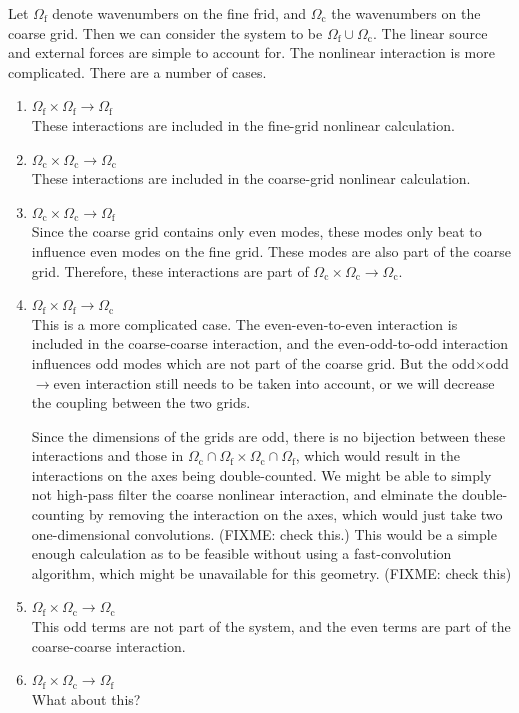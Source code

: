 \documentclass[10pt,showpacs,showkeys,%
amsfonts,amsmath,onecolumn,
floatfix,aps,superscriptaddress]{revtex4}
\begin{document}
Let $\Omega_{\text{f}}$ denote wavenumbers on the fine frid, and
$\Omega_{\text{c}}$ the wavenumbers on the coarse grid. Then we can
consider the system to be $\Omega_{\text{f}} \cup \Omega_{\text{c}}$.
The linear source and external forces are simple to account for.
The nonlinear interaction is more complicated.  There are a number
of cases.
\begin{enumerate}
  \item 
    $\Omega_{\text{f}} \times \Omega_{\text{f}}\rightarrow \Omega_{\text{f}}$\\
    These interactions are included in the fine-grid nonlinear calculation.
  \item 
    $\Omega_{\text{c}} \times \Omega_{\text{c}}\rightarrow \Omega_{\text{c}}$\\
    These interactions are included in the coarse-grid nonlinear calculation.
  \item 
    $\Omega_{\text{c}} \times \Omega_{\text{c}}\rightarrow \Omega_{\text{f}}$\\
    Since the coarse grid contains only even modes, these modes only beat
    to influence even modes on the fine grid.  These modes are also part
    of the coarse grid.  Therefore, these interactions are part of
    $\Omega_{\text{c}} \times \Omega_{\text{c}}\rightarrow \Omega_{\text{c}}$.
  \item
    $\Omega_{\text{f}} \times \Omega_{\text{f}}\rightarrow \Omega_{\text{c}}$\\
    This is a more complicated case. The even-even-to-even interaction
    is included in the coarse-coarse interaction, and the even-odd-to-odd
    interaction influences odd modes which are not part of the coarse grid.
    But the odd$\times$odd$\rightarrow$even interaction still needs to
    be taken into account, or we will decrease the coupling between the
    two grids.
    
    Since the dimensions of the grids are odd, there is no bijection
    between these interactions and those in 
    $\Omega_{\text{c}}\cap \Omega_{\text{f}} \times 
    \Omega_{\text{c}}\cap \Omega_{\text{f}}$, which would result in the 
    interactions on the axes being double-counted. We might be able to
    simply not high-pass filter the coarse nonlinear interaction, and 
    elminate the double-counting by removing the interaction on the 
    axes, which would just take two one-dimensional convolutions. 
    (FIXME: check this.) This would be a simple enough calculation
    as to be feasible without using a fast-convolution algorithm, which
    might be unavailable for this geometry. (FIXME: check this)
    
  \item
    $\Omega_{\text{f}} \times \Omega_{\text{c}}\rightarrow \Omega_{\text{c}}$\\
    This odd terms are not part of the system, and the even terms are
    part of the coarse-coarse interaction.
  \item
    $\Omega_{\text{f}} \times \Omega_{\text{c}}\rightarrow \Omega_{\text{f}}$\\
    What about this?
\end{enumerate}
\end{document}
